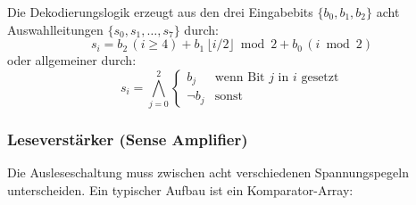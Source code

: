 \documentclass[12pt, a4paper]{article}
\theoremstyle{definition}
\theoremstyle{remark}
\begin{document}
  
  
  

Die Dekodierungslogik erzeugt aus den drei Eingabebits $\{b_0, b_1, b_2\}$ acht Auswahlleitungen $\{s_0, s_1, \ldots, s_7\}$ durch:
\[
s_i = b_2 \, (i \geq 4) + b_1 \, \lfloor i/2 \rfloor \bmod 2 + b_0 \, (i \bmod 2)
\]
oder allgemeiner durch:
\[
s_i = \bigwedge_{j=0}^{2} \begin{cases} b_j & \text{wenn Bit } j \text{ in } i \text{ gesetzt} \\ \neg b_j & \text{sonst} \end{cases}
\]

\subsubsection{Leseverstärker (Sense Amplifier)}

Die Ausleseschaltung muss zwischen acht verschiedenen Spannungspegeln unterscheiden. Ein typischer Aufbau ist ein Komparator-Array:

  
\end{document}
